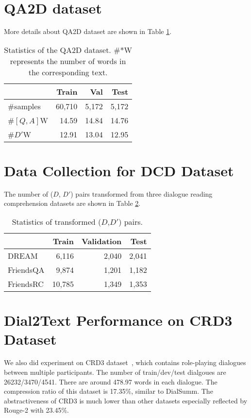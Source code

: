 \appendix

\section{QA2D dataset}
More details about QA2D dataset are shown in Table \ref{tab:qa2ddata}.
\begin{table}[h]
	\centering
	\begin{tabular}{lrrr}
		\toprule[1pt]
		\textbf{} & {Train}& {Val}& {Test} \\ 
		\midrule[1pt]
		{\#samples} & 60,710 &5,172&5,172\\
		{\#$[Q,A]$W} & 14.59 & 14.84&14.76\\
		{\#$D'$W} &12.91 &13.04&12.95\\
		\bottomrule[1pt]
	\end{tabular}
	\caption{Statistics of the QA2D dataset. \#*W represents the number of words in the corresponding text.}
	\label{tab:qa2ddata}
\end{table}

\section{Data Collection for DCD Dataset}

The number of ($D$, $D'$) pairs transformed from three dialogue reading comprehension datasets are shown in Table \ref{tab:qa2dstatistics}.

\begin{table}[h]
	\centering
	\begin{tabular}{lrrr}
		\toprule[1pt]
		\textbf{} & {Train}& {Validation}& {Test} \\ 
		\midrule[1pt]
		{DREAM} & 6,116 &2,040&2,041\\
		{FriendsQA}& 9,874 & 1,201&1,182\\
		{FriendsRC} &10,785&1,349&1,353\\
		\bottomrule[1pt]
	\end{tabular}
	\caption{Statistics of transformed ($D$,$D'$) pairs.}
	\label{tab:qa2dstatistics}
\end{table}

\section{Dial2Text Performance on CRD3 Dataset}

We also did experiment on CRD3 dataset~\cite{rameshkumar2020storytelling}, which contains role-playing dialogues between multiple participants. The number of train/dev/test dialgoues are 26232/3470/4541. There are around 478.97 words in each dialogue. The compression ratio of this dataset is 17.35\%, similar to DialSumm. The abstractiveness of CRD3 is much lower than other datasets especially reflected by Rouge-2 with 23.45\%. 

